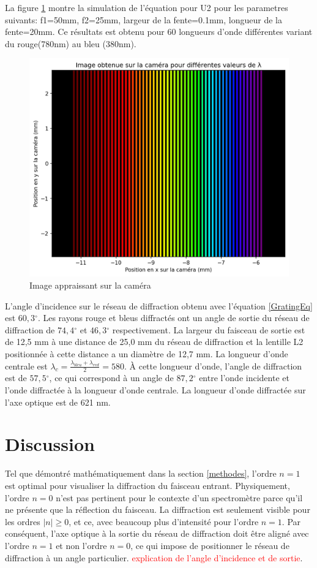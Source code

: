 \documentclass[conference]{IEEEtran}
\begin{document}
 La figure \ref{arc-en-ciel} montre la simulation de l'équation pour U2 pour les parametres suivants: 
 f1=50mm, f2=25mm, largeur de la fente=0.1mm, longueur de la fente=20mm. Ce résultats est obtenu pour
 60 longueurs d'onde différentes variant du rouge(780nm) au bleu (380nm). 
 \begin{figure}[H]
    \centering
    \includegraphics[scale=0.45]{simulation.png}
    \caption{Image appraissant sur la caméra}
    \label{arc-en-ciel}
\end{figure}


L'angle d'incidence sur le réseau de diffraction obtenu avec l'équation \ref{GratingEq}
est $60,3{^\circ}$. Les rayons rouge et bleus diffractés ont un angle de sortie du réseau
de diffraction de $74,4{^\circ}$ et $46,3{^\circ}$ respectivement. La largeur du faisceau
de sortie est de 12,5 mm à une distance de 25,0 mm du réseau de diffraction et la lentille L2
positionnée à cette distance a un diamètre de 12,7 mm. La longueur d'onde centrale est 
$\lambda_c=\frac{\lambda_{bleu}+\lambda_{red}}{2}=580$. À cette longueur d'onde, l'angle de 
diffraction est de $57,5{^\circ}$, ce qui correspond à un angle de $87,2{^\circ}$ entre 
l'onde incidente et l'onde diffractée à la longueur d'onde centrale. 
La longueur d'onde diffractée sur l'axe optique est de 621 nm.

\section{Discussion}
Tel que démontré mathématiquement dans la section \ref{methodes}, l'ordre $n=1$ est optimal pour visualiser la diffraction
du faisceau entrant. Physiquement, l'ordre $n=0$ n'est pas pertinent pour le contexte d'un spectromètre parce qu'il ne présente que 
la réflection du faisceau. La diffraction est seulement visible pour les ordres $|n|\geq0$, et ce, avec beaucoup plus d'intensité pour l'ordre $n=1$.
Par conséquent, l'axe optique à la sortie du réseau de diffraction doit être aligné avec l'ordre $n=1$ et non l'ordre $n=0$, ce qui impose
de positionner le réseau de diffraction à un angle particulier. \textcolor{red}{explication de l'angle d'incidence et de sortie}.
\end{document}
